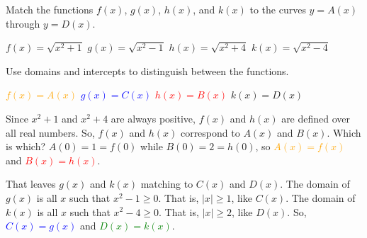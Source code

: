 \begin{Mquestion}
Match the functions $f(x)$, $g(x)$, $h(x)$, and $k(x)$ to the curves $y=A(x)$ through $y=D(x)$.
\begin{center}
$f(x)=\sqrt{x^2+1}$\hfill
$g(x)=\sqrt{x^2-1}$\hfill
$h(x)=\sqrt{x^2+4}$\hfill
$k(x)=\sqrt{x^2-4}$

\hfill
{}

\hfill
{}
\end{center}
\end{Mquestion}
\begin{hint}
Use domains and intercepts to distinguish between the functions.
\end{hint}
\begin{answer}
\textcolor{orange}{$f(x)=A(x)$}
\qquad
\textcolor{blue}{$g(x)=C(x)$}
\qquad
\textcolor{red}{$h(x)=B(x)$}
\qquad
\textcolor{green!90!black}{$k(x)=D(x)$}
\end{answer}
\begin{solution}
Since $x^2+1$ and $x^2+4$ are always positive, $f(x)$ and $h(x)$ are defined over all real numbers. So, $f(x)$ and $h(x)$ correspond to $A(x)$ and $B(x)$. Which is which? $A(0)=1=f(0)$ while $B(0)=2=h(0)$, so \textcolor{orange}{$A(x)=f(x)$} and
\textcolor{red}{$B(x)=h(x)$}.

That leaves $g(x)$ and $k(x)$ matching to $C(x)$ and $D(x)$. The domain of $g(x)$ is all $x$ such that $x^2-1\ge0$. That is, $|x|\ge1$, like $C(x)$.
The domain of $k(x)$ is all $x$ such that $x^2-4\ge0$. That is, $|x|\ge2$, like $D(x)$.
So, \textcolor{blue}{$C(x)=g(x)$} and \textcolor{green}{$D(x)=k(x)$}.
\end{solution}

